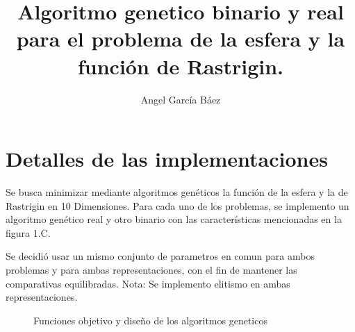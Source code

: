 \documentclass[runningheads]{llncs}
\begin{document}
%
\title{Algoritmo genetico binario y real para el problema de la esfera y la función de  Rastrigin.}
\author{Angel García Báez }
%
\maketitle              %
%
%
%
\section{Detalles de las implementaciones}

Se busca minimizar mediante algoritmos genéticos la función de la esfera y la de Rastrigin en 10 Dimensiones. Para cada uno de los problemas, se implemento un algoritmo genético real y otro binario con las características mencionadas en la figura 1.C. 

Se decidió usar un mismo conjunto de parametros en comun para ambos problemas y para ambas representaciones, con el fin de mantener las comparativas equilibradas. Nota: Se implemento elitismo en ambas representaciones.

\begin{figure}[htbp]
	\centering
	\hspace{0.01\textwidth} %
		\hspace{0.01\textwidth} %
	\vspace{-0.5em} %
	\caption{Funciones objetivo y diseño de los algoritmos geneticos}
	\label{fig:modelos}
\end{figure}
\end{document}
